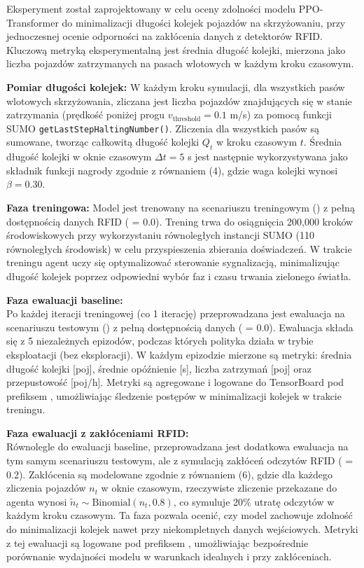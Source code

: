 \documentclass[12pt,a4paper]{article}
\begin{document}
Eksperyment został zaprojektowany w celu oceny zdolności modelu PPO-Transformer do minimalizacji długości kolejek pojazdów na skrzyżowaniu, przy jednoczesnej ocenie odporności na zakłócenia danych z detektorów RFID. Kluczową metryką eksperymentalną jest średnia długość kolejki, mierzona jako liczba pojazdów zatrzymanych na pasach wlotowych w każdym kroku czasowym.

\textbf{Pomiar długości kolejek:} W każdym kroku symulacji, dla wszystkich pasów wlotowych skrzyżowania, zliczana jest liczba pojazdów znajdujących się w stanie zatrzymania (prędkość poniżej progu $v_{\text{threshold}} = 0.1$ m/s) za pomocą funkcji SUMO \texttt{getLastStep\allowbreak Halting\allowbreak Number()}. Zliczenia dla wszystkich pasów są sumowane, tworząc całkowitą długość kolejki $Q_t$ w kroku czasowym $t$. Średnia długość kolejki w oknie czasowym $\Delta t = 5$ s jest następnie wykorzystywana jako składnik funkcji nagrody zgodnie z równaniem (4), gdzie waga kolejki wynosi $\beta = 0.30$.

\textbf{Faza treningowa:} Model jest trenowany na scenariuszu treningowym () z pełną dostępnością danych RFID ( = 0.0). Trening trwa do osiągnięcia 200,000 kroków środowiskowych przy wykorzystaniu równoległych instancji SUMO (110 równoległych środowisk) w celu przyspieszenia zbierania doświadczeń. W trakcie treningu agent uczy się optymalizować sterowanie sygnalizacją, minimalizując długość kolejek poprzez odpowiedni wybór faz i czasu trwania zielonego światła.

\textbf{Faza ewaluacji baseline:}\\
Po każdej iteracji treningowej (co 1 iterację) przeprowadzana jest ewaluacja na scenariuszu testowym () z pełną dostępnością danych ( = 0.0). Ewaluacja składa się z 5 niezależnych epizodów, podczas których polityka działa w trybie eksploatacji (bez eksploracji). W każdym epizodzie mierzone są metryki: średnia długość kolejki [poj], średnie opóźnienie [s], liczba zatrzymań [poj] oraz przepustowość [poj/h]. Metryki są agregowane i logowane do TensorBoard pod prefiksem , umożliwiając śledzenie postępów w minimalizacji kolejek w trakcie treningu.

\textbf{Faza ewaluacji z zakłóceniami RFID:}\\
Równolegle do ewaluacji baseline, przeprowadzana jest dodatkowa ewaluacja na tym samym scenariuszu testowym, ale z symulacją zakłóceń odczytów RFID ( = 0.2). Zakłócenia są modelowane zgodnie z równaniem (6), gdzie dla każdego zliczenia pojazdów $n_t$ w oknie czasowym, rzeczywiste zliczenie przekazane do agenta wynosi $\tilde{n}_t \sim \text{Binomial}(n_t, 0.8)$, co symuluje 20\% utratę odczytów w każdym kroku czasowym. Ta faza pozwala ocenić, czy model zachowuje zdolność do minimalizacji kolejek nawet przy niekompletnych danych wejściowych. Metryki z tej ewaluacji są logowane pod prefiksem , umożliwiając bezpośrednie porównanie wydajności modelu w warunkach idealnych i przy zakłóceniach.
\end{document}
